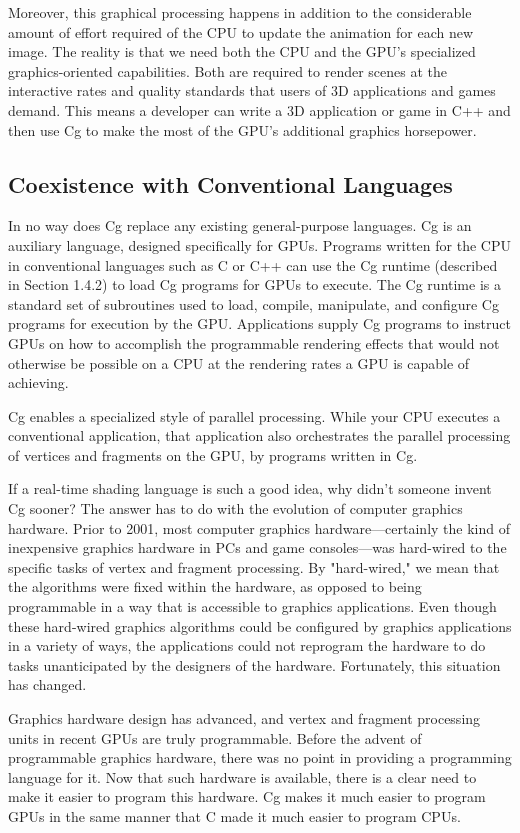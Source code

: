 \documentclass[../main.tex]{subfiles}
\begin{document}
Moreover, this graphical processing happens in addition to the considerable amount of effort required of the CPU to update the animation for each new image. The reality is that we need both the CPU and the GPU's specialized graphics-oriented capabilities. Both are required to render scenes at the interactive rates and quality standards that users of 3D applications and games demand. This means a developer can write a 3D application or game in C++ and then use Cg to make the most of the GPU's additional graphics horsepower.

\subsection{Coexistence with Conventional Languages}

In no way does Cg replace any existing general-purpose languages. Cg is an auxiliary language, designed specifically for GPUs. Programs written for the CPU in conventional languages such as C or C++ can use the Cg runtime (described in Section 1.4.2) to load Cg programs for GPUs to execute. The Cg runtime is a standard set of subroutines used to load, compile, manipulate, and configure Cg programs for execution by the GPU. Applications supply Cg programs to instruct GPUs on how to accomplish the programmable rendering effects that would not otherwise be possible on a CPU at the rendering rates a GPU is capable of achieving.

Cg enables a specialized style of parallel processing. While your CPU executes a conventional application, that application also orchestrates the parallel processing of vertices and fragments on the GPU, by programs written in Cg.

If a real-time shading language is such a good idea, why didn't someone invent Cg sooner? The answer has to do with the evolution of computer graphics hardware. Prior to 2001, most computer graphics hardware—certainly the kind of inexpensive graphics hardware in PCs and game consoles—was hard-wired to the specific tasks of vertex and fragment processing. By "hard-wired," we mean that the algorithms were fixed within the hardware, as opposed to being programmable in a way that is accessible to graphics applications. Even though these hard-wired graphics algorithms could be configured by graphics applications in a variety of ways, the applications could not reprogram the hardware to do tasks unanticipated by the designers of the hardware. Fortunately, this situation has changed.

Graphics hardware design has advanced, and vertex and fragment processing units in recent GPUs are truly programmable. Before the advent of programmable graphics hardware, there was no point in providing a programming language for it. Now that such hardware is available, there is a clear need to make it easier to program this hardware. Cg makes it much easier to program GPUs in the same manner that C made it much easier to program CPUs.
\end{document}
